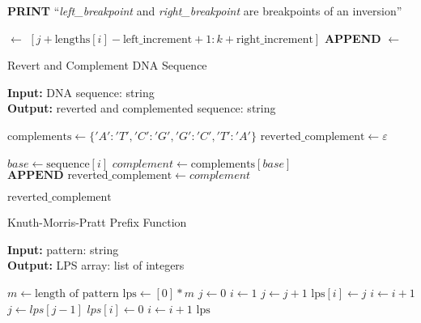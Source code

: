 \begin{algorithm}
\begin{algorithmic}[1]
        \STATE \textbf{PRINT} ``\textit{left\_breakpoint} and \textit{right\_breakpoint} are breakpoints of an inversion''

        \STATE {} $\gets$ $[j + \text{lengths}[i] - \text{left\_increment} + 1: k + \text{right\_increment}]$
        \STATE \textbf{APPEND}  $\gets$ 
    \ENDIF
\ENDFOR
\RETURN {}
\end{algorithmic}
\end{algorithm}




\begin{algorithm}
\caption{Revert and Complement DNA Sequence}
\hspace*{\algorithmicindent} \textbf{Input: } DNA sequence: string \\
\hspace*{\algorithmicindent} \textbf{Output: } reverted and complemented sequence: string
\begin{algorithmic}[1]


\STATE $\text{complements} \gets \{ 'A': 'T', 'C': 'G', 'G': 'C', 'T': 'A' \}$
\STATE $\text{reverted\_complement} \gets \varepsilon$

    \STATE $base \gets \text{sequence}[i]$
    \STATE $complement \gets \text{complements}[base]$
    \STATE $\textbf{APPEND} \text{ reverted\_complement} \gets complement$
\ENDFOR

\RETURN $\text{reverted\_complement}$
\end{algorithmic}
\end{algorithm}


\begin{algorithm}
\caption{Knuth-Morris-Pratt Prefix Function}
\hspace*{\algorithmicindent} \textbf{Input:} pattern: string \\
\hspace*{\algorithmicindent} \textbf{Output:} LPS array: list of integers

\begin{algorithmic}[1]
\STATE $m \gets \text{length of pattern}$
\STATE $\text{lps} \gets [0] * m$ 
\STATE $j \gets 0$ 
\STATE $i \gets 1$
        \STATE $j \gets j + 1$
        \STATE $\text{lps}[i] \gets j$
        \STATE $i \gets i + 1$
    \ELSE
            \STATE $j \gets lps[j - 1]$
        \ELSE
            \STATE $lps[i] \gets 0$
            \STATE $i \gets i + 1$
        \ENDIF
    \ENDIF
\ENDWHILE
\RETURN $\text{lps}$
\end{algorithmic}
\end{algorithm}


